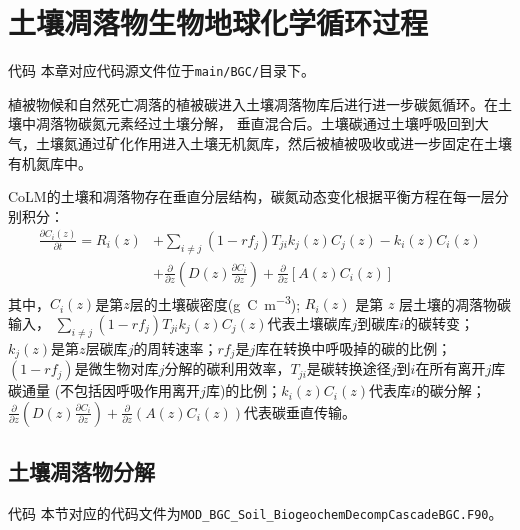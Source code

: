 \chapter{土壤凋落物生物地球化学循环过程}\label{土壤凋落物生物地球化学循环过程}
\begin{mymdframed}{代码}
  本章对应代码源文件位于\texttt{main/BGC/}目录下。
\end{mymdframed}

植被物候和自然死亡凋落的植被碳进入土壤凋落物库后进行进一步碳氮循环。在土壤中凋落物碳氮元素经过土壤分解，
垂直混合后。土壤碳通过土壤呼吸回到大气，土壤氮通过矿化作用进入土壤无机氮库，然后被植被吸收或进一步固定在土壤有机氮库中。

CoLM的土壤和凋落物存在垂直分层结构，碳氮动态变化根据平衡方程在每一层分别积分：
\begin{equation}
  \begin{aligned}
    \frac{\partial C_{i}(z)}{\partial t}=R_{i}(z) &+\sum_{i \neq j}\left(1-r f_{j}\right) T_{j i} k_{j}(z) C_{j}(z)-k_{i}(z) C_{i}(z) \\
    &+\frac{\partial}{\partial z}\left(D(z) \frac{\partial C_{i}}{\partial z}\right)+\frac{\partial}{\partial z}\left[A(z) C_{i}(z)\right]
  \end{aligned}
\end{equation}
其中，$C_i\left(z\right)$是第$z$层的土壤碳密度(\unit{g.C.m^{-3}}); $R_i (z)$ 是第 $z$ 层土壤的凋落物碳输入，
$\sum_{i\neq j}{\left(1-{rf}_j\right)T_{ji}k_j\left(z\right)C_j\left(z\right)}$代表土壤碳库$j$到碳库$i$的碳转变；
$k_j\left(z\right)$是第$z$层碳库$j$的周转速率；${rf}_j$是$j$库在转换中呼吸掉的碳的比例；
$\left(1-{rf}_j\right)$是微生物对库$j$分解的碳利用效率，$T_{ji}$是碳转换途径$j$到$i$在所有离开$j$库碳通量
(不包括因呼吸作用离开$j$库)的比例；$k_i\left(z\right)C_i\left(z\right)$代表库$i$的碳分解；
$\frac{\partial}{\partial z}\left(D\left(z\right)\frac{\partial C_i}{\partial z}\right)+\frac{\partial}{\partial z}\left(A\left(z\right)C_i\left(z\right)\right)$代表碳垂直传输。


\section{土壤凋落物分解}\label{土壤凋落物分解}

\begin{mymdframed}{代码}
  本节对应的代码文件为\texttt{MOD\_BGC\_Soil\_BiogeochemDecompCascadeBGC.F90}。
\end{mymdframed}

